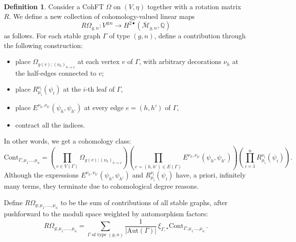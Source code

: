 \documentclass[11pt,reqno]{amsart}
\numberwithin{equation}{section}
\newcommand{\Aut}{\mathrm{Aut}}
\newcommand{\mb}[1]{\mathbb{#1}}
\newcommand{\mc}[1]{\mathcal{#1}}
\newcommand{\mr}[1]{\mathrm{#1}}
\newcommand{\Q}{\mb{Q}}
\newcommand{\M}{\mc{M}}
\newcommand{\Mbar}{\overline{\M}}
\theoremstyle{plain}
\theoremstyle{definition}
\newtheorem{definition}[theorem]{Definition}
\begin{document}
\begin{definition}
  Consider a CohFT $\Omega$ on $(V,\eta)$ together with a rotation matrix $R$. We define a new collection of cohomology-valued linear maps
  \begin{equation}
    R\Omega_{g,n} \colon V^{\otimes n} \longrightarrow H^{2\bullet}(\Mbar_{g,n},\Q)
  \end{equation}
  as follows. For each stable graph $\Gamma$ of type $(g,n)$, define a contribution through the following construction:
  \begin{itemize}
    \item place $\Omega_{g(v);(\nu_h)_{h \rightsquigarrow v}}$ at each vertex $v$ of $\Gamma$, with arbitrary decorations $\nu_h$ at the half-edges connected to $v$;

    \item place $R_{\mu_i}^{\nu_i}(\psi_{i})$ at the $i$-th leaf of $\Gamma$,

    \item place $E^{\nu_{h},\nu_{h'}}(\psi_{h},\psi_{h'})$ at every edge $e = (h,h')$ of $\Gamma$,

    \item contract all the indices.
  \end{itemize}
  In other words, we get a cohomology class:
  \begin{equation}
    \mr{Cont}_{\Gamma;\mu_1\ldots,\mu_n}
    =
    \left(
      \prod_{v \in V(\Gamma)}
        \Omega_{g(v);(\nu_h)_{h \rightsquigarrow v}}
    \right) \!
    \left(
      \prod_{e = (h,h') \in E(\Gamma)}
        E^{\nu_{h},\nu_{h'}}(\psi_{h},\psi_{h'})
    \right) \!
    \left(
      \prod_{i = 1}^{n}
        R_{\mu_i}^{\nu_i}(\psi_{i})
    \right) .
  \end{equation}
  Although the expressions $E^{\nu_{h},\nu_{h'}}(\psi_{h},\psi_{h'})$ and $R_{\mu_i}^{\nu_i}(\psi_{i})$ have, a priori, infinitely many terms, they terminate due to cohomological degree reasons.

  Define $R\Omega_{g;\mu_1,\ldots,\mu_n}$ to be the sum of contributions of all stable graphs, after pushforward to the moduli space weighted by automorphism factors:
  \begin{equation}
    R\Omega_{g;\mu_1,\ldots,\mu_n}
    =
    \sum_{\Gamma \text{ of type }(g,n)}
      \frac{1}{|\Aut(\Gamma)|} \,
      \xi_{\Gamma,*}
      \mr{Cont}_{\Gamma;\mu_1\ldots,\mu_n} \,.
  \end{equation}
\end{definition}
\end{document}
